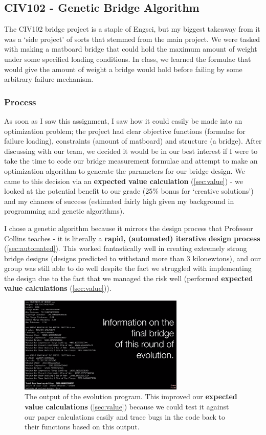 \documentclass[a4paper,12pt]{article}
\begin{document}
\subsection{CIV102 - Genetic Bridge Algorithm}
\label{sec:bridge}
The CIV102 bridge project is a staple of Engsci, but my biggest takeaway from it was a ‘side project’ of sorts that stemmed from the main project. We were tasked with making a matboard bridge that could hold the maximum amount of weight under some specified loading conditions. In class, we learned the formulae that would give the amount of weight a bridge would hold before failing by some arbitrary failure mechanism.

\subsubsection{Process}

As soon as I saw this assignment, I saw how it could easily be made into an optimization problem; the project had clear objective functions (formulae for failure loading), constraints (amount of matboard) and structure (a bridge). After discussing with our team, we decided it would be in our best interest if I were to take the time to code our bridge measurement formulae and attempt to make an optimization algorithm to generate the parameters for our bridge design. We came to this decision via an \textbf{expected value calculation} (\ref{sec:value}) - we looked at the potential benefit to our grade (25\% bonus for ‘creative solutions’) and my chances of success (estimated fairly high given my background in programming and genetic algorithms).

I chose a genetic algorithm because it mirrors the design process that Professor Collins teaches - it is literally a \textbf{rapid, (automated) iterative design process} (\ref{sec:automated}). This worked fantastically well in creating extremely strong bridge designs (designs predicted to withstand more than 3 kilonewtons), and our group was still able to do well despite the fact we struggled with implementing the design due to the fact that we managed the risk well (performed \textbf{expected value calculations} (\ref{sec:value})).

\begin{figure}[H]
\centering
\includegraphics[width=0.7\textwidth]{img/image005.png}
\caption{The output of the evolution program. This improved our \textbf{expected value calculations} (\ref{sec:value}) because we could test it against our paper calculations easily and trace bugs in the code back to their functions based on this output.}
\label{}
\end{figure}
\end{document}
